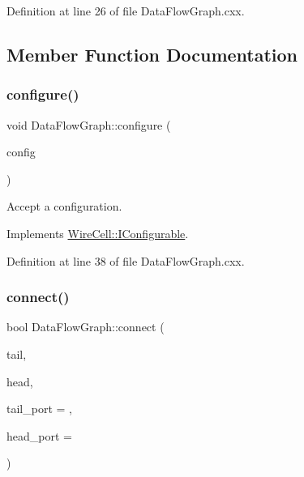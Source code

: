 Definition at line 26 of file Data\+Flow\+Graph.\+cxx.



\subsection{Member Function Documentation}
\mbox{\label{class_wire_cell_tbb_1_1_data_flow_graph_a2c4fe387fa89d26296925548ee7ff1ab}} 
\subsubsection{\texorpdfstring{configure()}{configure()}}
{\footnotesize\ttfamily void Data\+Flow\+Graph\+::configure (\begin{DoxyParamCaption}\item[{const \hyperlink{namespace_wire_cell_a9f705541fc1d46c608b3d32c182333ee}{Wire\+Cell\+::\+Configuration} \&}]{config }\end{DoxyParamCaption})\hspace{0.3cm}{\ttfamily [virtual]}}



Accept a configuration. 



Implements \hyperlink{class_wire_cell_1_1_i_configurable_a57ff687923a724093df3de59c6ff237d}{Wire\+Cell\+::\+I\+Configurable}.



Definition at line 38 of file Data\+Flow\+Graph.\+cxx.

\mbox{\label{class_wire_cell_tbb_1_1_data_flow_graph_a37432ebdd10107bbcc99205893c2587b}} 
\subsubsection{\texorpdfstring{connect()}{connect()}}
{\footnotesize\ttfamily bool Data\+Flow\+Graph\+::connect (\begin{DoxyParamCaption}\item[{\hyperlink{class_wire_cell_1_1_interface_a09c548fb8266cfa39afb2e74a4615c37}{Wire\+Cell\+::\+I\+Node\+::pointer}}]{tail,  }\item[{\hyperlink{class_wire_cell_1_1_interface_a09c548fb8266cfa39afb2e74a4615c37}{Wire\+Cell\+::\+I\+Node\+::pointer}}]{head,  }\item[{size\+\_\+t}]{tail\+\_\+port = {},  }\item[{size\+\_\+t}]{head\+\_\+port = {} }\end{DoxyParamCaption})\hspace{0.3cm}{\ttfamily [virtual]}}

